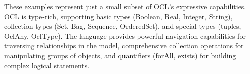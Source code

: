 These examples represent just a small subset of OCL's expressive capabilities. OCL is type-rich, supporting basic types (Boolean, Real, Integer, String), collection types (Set, Bag, Sequence, OrderedSet), and special types (tuples, OclAny, OclType). The language provides powerful navigation capabilities for traversing relationships in the model, comprehensive collection operations for manipulating groups of objects, and quantifiers (forAll, exists) for building complex logical statements.






